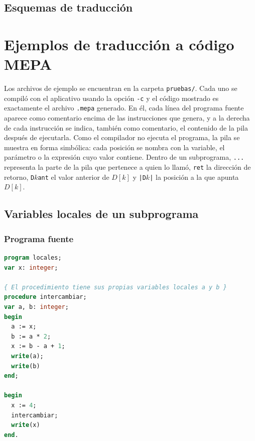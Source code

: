 \documentclass[12pt]{article}
\begin{document}
\subsection{Esquemas de traducción}


\section{Ejemplos de traducción a código MEPA}

Los archivos de ejemplo se encuentran en la carpeta \texttt{pruebas/}. Cada uno se compiló con el aplicativo usando la opción \texttt{-c} y el código mostrado es exactamente el archivo \texttt{.mepa} generado. En él, cada línea del programa fuente aparece como comentario encima de las instrucciones que genera, y a la derecha de cada instrucción se indica, también como comentario, el contenido de la pila después de ejecutarla. Como el compilador no ejecuta el programa, la pila se muestra en forma simbólica: cada posición se nombra con la variable, el parámetro o la expresión cuyo valor contiene. Dentro de un subprograma, \texttt{...} representa la parte de la pila que pertenece a quien lo llamó, \texttt{ret} la dirección de retorno, \texttt{D$k$ant} el valor anterior de $D[k]$ y \texttt{|D$k$|} la posición a la que apunta $D[k]$.

\subsection{Variables locales de un subprograma}


\subsubsection*{Programa fuente}
\begin{lstlisting}[frame=single, language=pascal, basicstyle=\ttfamily\small]
program locales;
var x: integer;

{ El procedimiento tiene sus propias variables locales a y b }
procedure intercambiar;
var a, b: integer;
begin
  a := x;
  b := a * 2;
  x := b - a + 1;
  write(a);
  write(b)
end;

begin
  x := 4;
  intercambiar;
  write(x)
end.
\end{lstlisting}
\end{document}
